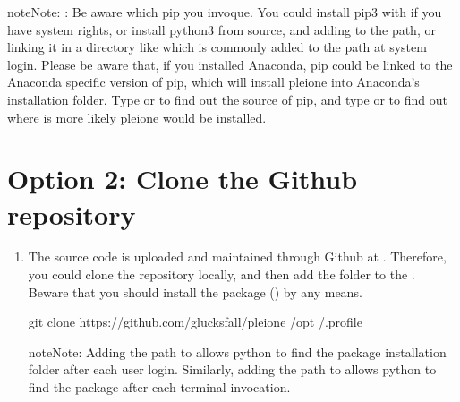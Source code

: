 \documentclass[letterpaper,10pt,english]{sphinxmanual}
\begin{document}
\begin{enumerate}
\begin{sphinxadmonition}{note}{Note:}
:
Be aware which pip you invoque. You could install pip3 with
 if you have system rights, or
install python3 from source, and adding  to the
path, or linking it in a directory like  which is commonly
added to the path at system login. Please be aware that, if you installed
Anaconda, pip could be linked to the Anaconda specific version of pip, which
will install pleione into Anaconda’s installation folder.
Type  or  to find out the source of pip, and type
 or  to find out where is more likely
pleione would be installed.
\end{sphinxadmonition}

\end{enumerate}


\section{Option 2: Clone the Github repository}
\label{\detokenize{Installation:option-2-clone-the-github-repository}}\begin{enumerate}
\def\theenumi{\arabic{enumi}}
\def\labelenumi{\theenumi .}
\makeatletter\def\p@enumii{\p@enumi \theenumi .}\makeatother
\item {} 

The source code is uploaded and maintained through Github at
. Therefore, you could clone the
repository locally, and then add the folder to the . Beware
that you should install the  package () by any means.

%
\begin{sphinxVerbatim}[commandchars=\\\{\}]
git clone https://github.com/glucksfall/pleione /opt
   \PYGZgt{}\PYGZgt{} /.profile
\end{sphinxVerbatim}

\begin{sphinxadmonition}{note}{Note:}
Adding the path to  allows python to find the package
installation folder after each user login. Similarly, adding the path to
 allows python to find the package after each terminal
invocation.
\end{sphinxadmonition}

\end{enumerate}
\end{document}
